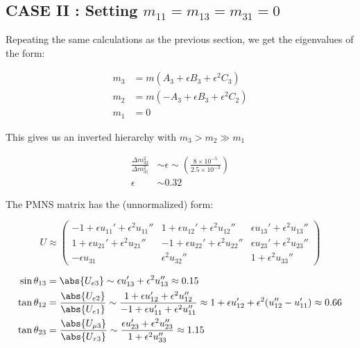 \subsection{CASE II : Setting $m_{11}=m_{13}=m_{31}=0$}

Repeating the same calculations as the previous section, we get the eigenvalues of the form:

\begin{align}
    m_3 &= m (A_3 + \epsilon B_3 + \epsilon^2 C_3)\\
    m_2 &= m (-A_3 + \epsilon B_3 + \epsilon^2 C_2)\\
    m_1 &= 0
\end{align}

This gives us an inverted hierarchy with $m_3 > m_2 \gg m_1$

\begin{align} 
    \frac{\Delta m_{32}^2}{\Delta m_{31}^2} &\sim \epsilon \sim \left( \frac{8 \times 10^{-5}}{ 2.5 \times 10^{-3}} \right) \\
    \epsilon &\sim 0.32
\end{align}

The PMNS matrix has the (unnormalized) form:

\begin{equation}
    U \approx 
    \begin{pmatrix}
        -1+ \epsilon u_{11}' +\epsilon^2 u_{11}'' & 1 + \epsilon u_{12}' +\epsilon^2 u_{12}'' & \epsilon u_{13}' +\epsilon^2 u_{13}'' \\
        1 + \epsilon u_{21}' +\epsilon^2 u_{21}'' & -1 + \epsilon u_{22}' +\epsilon^2 u_{22}'' &  \epsilon u_{23}' +\epsilon^2 u_{23}'' \\
        -\epsilon u_{31} &  \epsilon^2 u_{32}'' & 1 + \epsilon^2 u_{33}''
    \end{pmatrix}
\end{equation}

\begin{align}
    \sin \theta_{13} &= \abs{U_{e3}} \sim  \epsilon u_{13}' +\epsilon^2 u_{13}'' \approx 0.15 \\
    \tan \theta_{12} &= \frac{\abs{U_{e2}}}{\abs{U_{e1}}} \sim \frac{1 + \epsilon u_{12}' +\epsilon^2 u_{12}''}{-1 + \epsilon u_{11}' +\epsilon^2 u_{11}''}\approx 1 + \epsilon u_{12}' +\epsilon^2 (u_{12}'' - u_{11}')  \approx 0.66 \\
    \tan \theta_{23} &= \frac{\abs{U_{\mu3}}}{\abs{U_{\tau3}}} \sim \frac{ \epsilon u_{23}' +\epsilon^2 u_{23}''}{ 1 +\epsilon^2 u_{33}''} \approx 1.15
\end{align}

